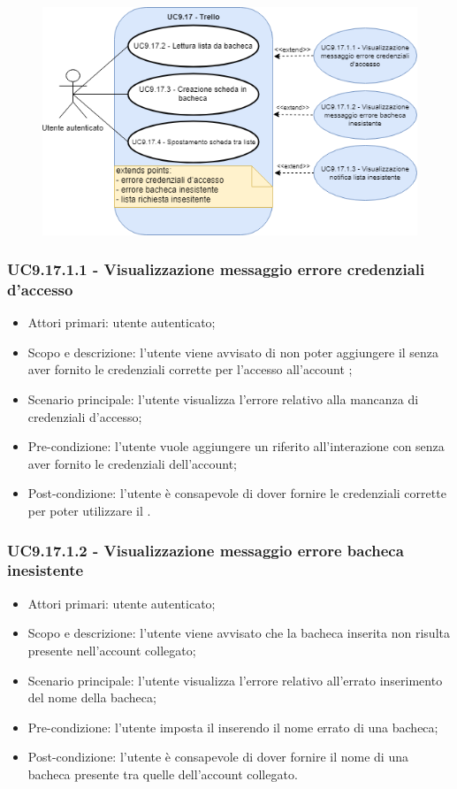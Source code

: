 \begin{figure}[H]
	\centering
	\includegraphics[width=14cm,keepaspectratio]{../includes/pics/trello.png}
	\caption{\label{fig:mission} }
\end{figure}

\subsubsection{UC9.17.1.1 - Visualizzazione messaggio errore credenziali d'accesso}
\begin{itemize}
	\item  Attori primari: utente autenticato;
	\item  Scopo e descrizione: l'utente viene avvisato di non poter aggiungere il  senza aver fornito le credenziali corrette per l'accesso all'account ;
	\item  Scenario principale: l'utente visualizza l'errore relativo alla mancanza di credenziali d'accesso;
	\item  Pre-condizione: l'utente vuole aggiungere un  riferito all'interazione con  senza aver fornito le credenziali dell'account;
	\item  Post-condizione: l'utente è consapevole di dover fornire le credenziali corrette per poter utilizzare il .
\end{itemize}
\subsubsection{UC9.17.1.2 - Visualizzazione messaggio errore bacheca inesistente}
\begin{itemize}
	\item  Attori primari: utente autenticato;
	\item  Scopo e descrizione: l'utente viene avvisato che la bacheca inserita non risulta presente nell'account collegato;
	\item  Scenario principale: l'utente visualizza l'errore relativo all'errato inserimento del nome della bacheca;
	\item  Pre-condizione: l'utente imposta il  inserendo il nome errato di una bacheca;
	\item  Post-condizione: l'utente è consapevole di dover fornire il nome di una bacheca presente tra quelle dell'account collegato.
\end{itemize}
